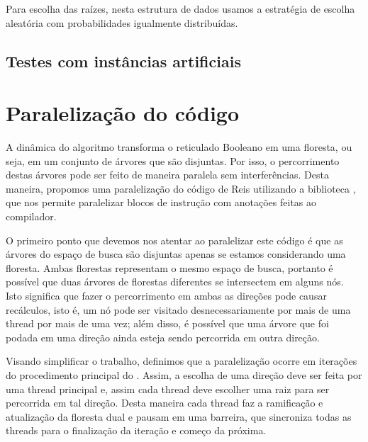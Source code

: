 Para escolha das raízes, nesta estrutura de dados usamos a estratégia 
de escolha aleatória com probabilidades igualmente distribuídas.

\subsection{Testes com instâncias artificiais}

\section{Paralelização do código}
A dinâmica do algoritmo  transforma o
reticulado Booleano em uma floresta, ou seja, em um conjunto de árvores
que são disjuntas. Por isso, o percorrimento destas árvores pode ser
feito de maneira paralela sem interferências. Desta maneira, propomos
uma paralelização do código de Reis utilizando a biblioteca 
, que nos permite paralelizar blocos de instrução
com anotações feitas ao compilador.

O primeiro ponto que devemos nos atentar ao paralelizar este código é
que as árvores do espaço de busca são disjuntas apenas se estamos 
considerando uma floresta. Ambas florestas representam o mesmo espaço de
busca, portanto é possível que duas árvores de florestas diferentes se 
intersectem em alguns nós. Isto significa que fazer o percorrimento em
ambas as direções pode causar recálculos, isto é, um nó pode ser 
visitado desnecessariamente por mais de uma thread por mais de uma vez;
além disso, é possível que uma árvore que foi podada em uma direção 
ainda esteja sendo percorrida em outra direção.

Visando simplificar o trabalho, definimos que a paralelização ocorre em
iterações do procedimento principal do . Assim, a escolha
de uma direção deve ser feita por uma thread principal e, assim cada
thread deve escolher uma raiz para ser percorrida em tal direção. Desta
maneira cada thread faz a ramificação e atualização da floresta dual
e pausam em uma barreira, que sincroniza todas as threads para o 
finalização da iteração e começo da próxima.

